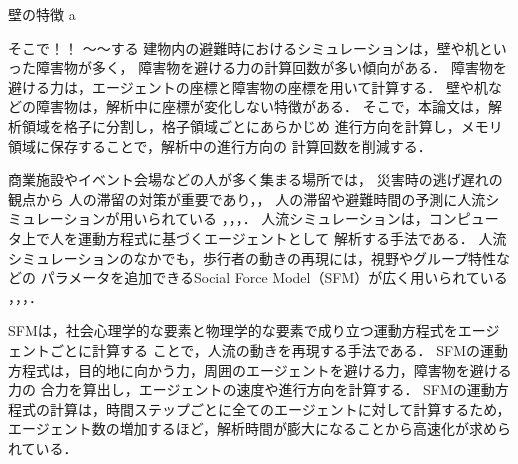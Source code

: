 壁の特徴
a

そこで！！
～～する
建物内の避難時におけるシミュレーションは，壁や机といった障害物が多く，
障害物を避ける力の計算回数が多い傾向がある．
障害物を避ける力は，エージェントの座標と障害物の座標を用いて計算する．
壁や机などの障害物は，解析中に座標が変化しない特徴がある．
そこで，本論文は，解析領域を格子に分割し，格子領域ごとにあらかじめ
進行方向を計算し，メモリ領域に保存することで，解析中の進行方向の
計算回数を削減する．


商業施設やイベント会場などの人が多く集まる場所では，
災害時の逃げ遅れの観点から
人の滞留の対策が重要であり\cite{taisaku1}，\cite{taisaku2}，
人の滞留や避難時間の予測に人流シミュレーションが用いられている
\cite{sim_jirei1}，\cite{sim_jirei2}，\cite{sim_jirei3}，\cite{sim_jirei8}．
人流シミュレーションは，コンピュータ上で人を運動方程式に基づくエージェントとして
解析する手法である．
人流シミュレーションのなかでも，歩行者の動きの再現には，視野やグループ特性などの
パラメータを追加できるSocial Force Model（SFM）が広く用いられている
\cite{helbing_sfm}，\cite{sfm_ntt}，\cite{sfm_para1}，\cite{intro_gunshu}．

SFMは，社会心理学的な要素と物理学的な要素で成り立つ運動方程式をエージェントごとに計算する
ことで，人流の動きを再現する手法である．
SFMの運動方程式は，目的地に向かう力，周囲のエージェントを避ける力，障害物を避ける力の
合力を算出し，エージェントの速度や進行方向を計算する．
SFMの運動方程式の計算は，時間ステップごとに全てのエージェントに対して計算するため，
エージェント数の増加するほど，解析時間が膨大になることから高速化が求められている．

